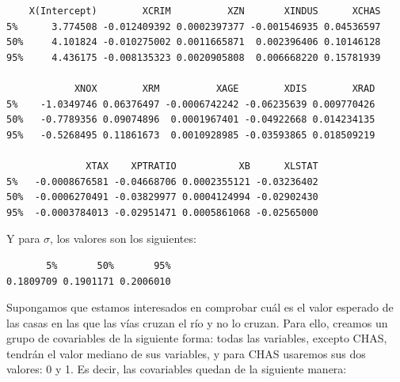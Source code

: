 \documentclass[12pt,a4paper,twoside,openright,titlepage,final]{article}
\begin{document}
\begin{verbatim}
    X(Intercept)        XCRIM          XZN       XINDUS      XCHAS
5%      3.774508 -0.012409392 0.0002397377 -0.001546935 0.04536597
50%     4.101824 -0.010275002 0.0011665871  0.002396406 0.10146128
95%     4.436175 -0.008135323 0.0020905808  0.006668220 0.15781939

            XNOX        XRM          XAGE        XDIS        XRAD    
5%    -1.0349746 0.06376497 -0.0006742242 -0.06235639 0.009770426 
50%   -0.7789356 0.09074896  0.0001967401 -0.04922668 0.014234135
95%   -0.5268495 0.11861673  0.0010928985 -0.03593865 0.018509219

              XTAX    XPTRATIO           XB      XLSTAT
5%   -0.0008676581 -0.04668706 0.0002355121 -0.03236402
50%  -0.0006270491 -0.03829977 0.0004124994 -0.02902430
95%  -0.0003784013 -0.02951471 0.0005861068 -0.02565000
\end{verbatim}

Y para $\sigma$, los valores son los siguientes:

\begin{verbatim}
       5%       50%       95% 
0.1809709 0.1901171 0.2006010 
\end{verbatim}

Supongamos que estamos interesados en comprobar cuál es el valor esperado de las casas en las que las vías cruzan el río y no lo cruzan. Para ello, creamos un grupo de covariables de la siguiente forma: todas las variables, excepto CHAS, tendrán el valor mediano de sus variables, y para CHAS usaremos sus dos valores: 0 y 1. Es decir, las covariables quedan de la siguiente manera:

\begin{table}[htbp!]
\centering
{}
\end{table}
\end{document}

